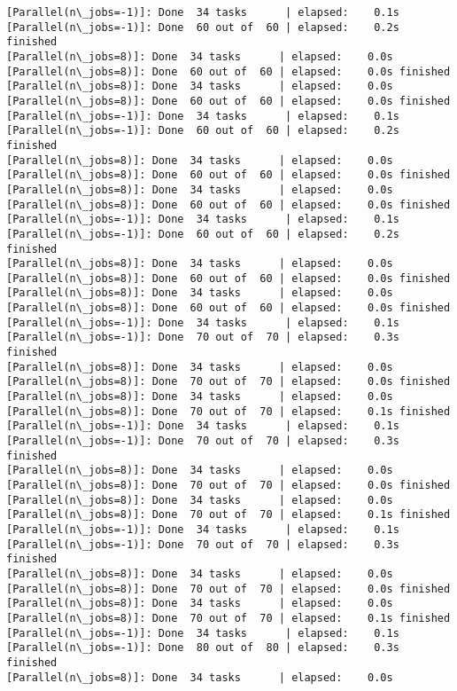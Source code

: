 \documentclass[11pt]{article}
\begin{document}
\begin{Verbatim}[commandchars=\\\{\}]
[Parallel(n\_jobs=-1)]: Done  34 tasks      | elapsed:    0.1s
[Parallel(n\_jobs=-1)]: Done  60 out of  60 | elapsed:    0.2s finished
[Parallel(n\_jobs=8)]: Done  34 tasks      | elapsed:    0.0s
[Parallel(n\_jobs=8)]: Done  60 out of  60 | elapsed:    0.0s finished
[Parallel(n\_jobs=8)]: Done  34 tasks      | elapsed:    0.0s
[Parallel(n\_jobs=8)]: Done  60 out of  60 | elapsed:    0.0s finished
[Parallel(n\_jobs=-1)]: Done  34 tasks      | elapsed:    0.1s
[Parallel(n\_jobs=-1)]: Done  60 out of  60 | elapsed:    0.2s finished
[Parallel(n\_jobs=8)]: Done  34 tasks      | elapsed:    0.0s
[Parallel(n\_jobs=8)]: Done  60 out of  60 | elapsed:    0.0s finished
[Parallel(n\_jobs=8)]: Done  34 tasks      | elapsed:    0.0s
[Parallel(n\_jobs=8)]: Done  60 out of  60 | elapsed:    0.0s finished
[Parallel(n\_jobs=-1)]: Done  34 tasks      | elapsed:    0.1s
[Parallel(n\_jobs=-1)]: Done  60 out of  60 | elapsed:    0.2s finished
[Parallel(n\_jobs=8)]: Done  34 tasks      | elapsed:    0.0s
[Parallel(n\_jobs=8)]: Done  60 out of  60 | elapsed:    0.0s finished
[Parallel(n\_jobs=8)]: Done  34 tasks      | elapsed:    0.0s
[Parallel(n\_jobs=8)]: Done  60 out of  60 | elapsed:    0.0s finished
[Parallel(n\_jobs=-1)]: Done  34 tasks      | elapsed:    0.1s
[Parallel(n\_jobs=-1)]: Done  70 out of  70 | elapsed:    0.3s finished
[Parallel(n\_jobs=8)]: Done  34 tasks      | elapsed:    0.0s
[Parallel(n\_jobs=8)]: Done  70 out of  70 | elapsed:    0.0s finished
[Parallel(n\_jobs=8)]: Done  34 tasks      | elapsed:    0.0s
[Parallel(n\_jobs=8)]: Done  70 out of  70 | elapsed:    0.1s finished
[Parallel(n\_jobs=-1)]: Done  34 tasks      | elapsed:    0.1s
[Parallel(n\_jobs=-1)]: Done  70 out of  70 | elapsed:    0.3s finished
[Parallel(n\_jobs=8)]: Done  34 tasks      | elapsed:    0.0s
[Parallel(n\_jobs=8)]: Done  70 out of  70 | elapsed:    0.0s finished
[Parallel(n\_jobs=8)]: Done  34 tasks      | elapsed:    0.0s
[Parallel(n\_jobs=8)]: Done  70 out of  70 | elapsed:    0.1s finished
[Parallel(n\_jobs=-1)]: Done  34 tasks      | elapsed:    0.1s
[Parallel(n\_jobs=-1)]: Done  70 out of  70 | elapsed:    0.3s finished
[Parallel(n\_jobs=8)]: Done  34 tasks      | elapsed:    0.0s
[Parallel(n\_jobs=8)]: Done  70 out of  70 | elapsed:    0.0s finished
[Parallel(n\_jobs=8)]: Done  34 tasks      | elapsed:    0.0s
[Parallel(n\_jobs=8)]: Done  70 out of  70 | elapsed:    0.1s finished
[Parallel(n\_jobs=-1)]: Done  34 tasks      | elapsed:    0.1s
[Parallel(n\_jobs=-1)]: Done  80 out of  80 | elapsed:    0.3s finished
[Parallel(n\_jobs=8)]: Done  34 tasks      | elapsed:    0.0s

\end{Verbatim}
\end{document}
